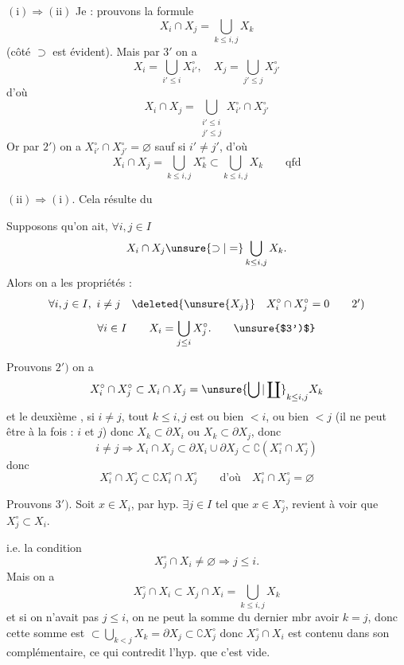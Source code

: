 
$(\mathrm{i})\Longrightarrow(\mathrm{ii})$ Je  : prouvons la formule
\[
X_i\cap X_j=\bigcup_{k\leq i,j}X_k
\]
(côté $\supset$ est évident). Mais par $3'$ on a
\[
X_i=\bigcup_{i'\leq i}X_{i'}^\circ,\quad X_j=\bigcup_{j'\leq j}X_{j'}^\circ
\]
d'où
\[
X_i\cap X_j=\bigcup_{\substack{i'\leq i\\j'\leq j}}X_{i'}^\circ\cap X_{j'}^\circ
\]
Or par $2')$ on a $X_{i'}^\circ\cap X_{j'}^\circ=\varnothing$ sauf si $i'\ne j'$, d'où
\[
X_i\cap X_j=\bigcup_{k\leq i,j}X_k^\circ\subset\bigcup_{k\leq i,j}X_k\qquad\text{qfd}
\]

$(\mathrm{ii})\Longrightarrow(\mathrm{i})$. Cela résulte du

  Supposons qu'on ait, $\forall i,j\in I$
\[
X_i\cap X_j\unsure{\supset|=}\bigcup_{k\leq i,j}X_k.
\]
Alors on a les propriétés :
\[
\forall i,j\in I,\ i\ne j\quad\deleted{\unsure{X_j}}\quad X_i^\circ\cap X_j^\circ=0\tag*{$2')$}
\]
\[
\forall i\in I\qquad X_i=\bigcup_{j\leq i}X_j^\circ.\tag*{\unsure{$3')$}}
\]

Prouvons $2')$ on a 
\[
X_i^\circ\cap X_j^\circ\subset X_i\cap X_j=\unsure{\bigcup|\coprod}_{k\leq i,j}X_k
\]
et le deuxième , si $i\ne j$,  tout $k\leq i,j$ est ou bien $<i$, ou bien $<j$ (il ne peut être  à la fois : $i$ et $j$) donc  $X_k\subset\partial X_i$ ou $X_k\subset\partial X_j$, donc
\[
i\ne j\Longrightarrow X_i\cap X_j\subset\partial X_i\cup\partial X_j\subset\complement(X_i^\circ\cap X_j^\circ)
\]
donc
\[
X_i^\circ\cap X_j^\circ\subset\complement X_i^\circ\cap X_j^\circ\qquad\text{d'où}\quad X_i^\circ\cap X_j^\circ=\varnothing
\]

Prouvons $3')$.  Soit $x\in X_i$, par hyp. $\exists j\in I$ tel que $x\in X_j^\circ$,  revient à voir que $X_j^\circ\subset X_i$.

i.e. la  condition
\[
X_j^\circ\cap X_i\ne\varnothing\Longrightarrow j\leq i.
\]
Mais on a
\[
X_j^\circ\cap X_i\subset X_j\cap X_i=\bigcup_{k\leq i,j}X_k
\]
et si on n'avait pas $j\leq i$, on ne peut  la somme du dernier mbr avoir $k=j$, donc cette somme est $\subset\bigcup_{k<j}X_k=\partial X_j\subset\complement X_j^\circ$  donc $X_j^\circ\cap X_i$ est contenu dans son complémentaire, ce qui contredit l'hyp. que c'est vide.

